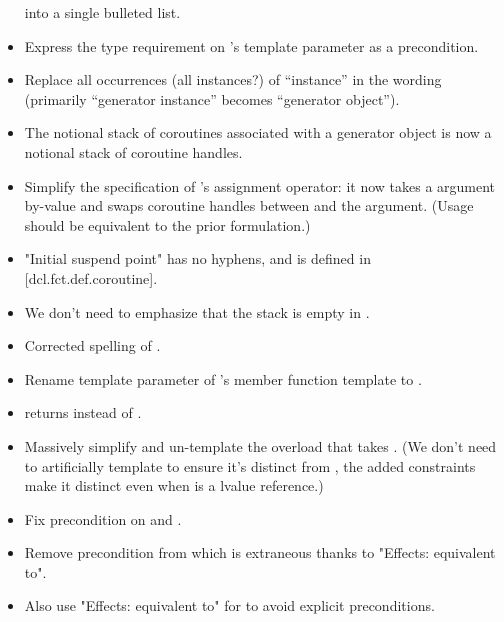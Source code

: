 \documentclass{wg21}
\begin{document}
\begin{itemize}
  into a single bulleted list.
\item Express the type requirement on 's 
  template parameter as a precondition.
\item Replace all occurrences (all instances?) of ``instance'' in the wording
  (primarily ``generator instance'' becomes ``generator object'').
\item The notional stack of coroutines associated with a generator object
  is now a notional stack of coroutine handles.
\item Simplify the specification of 's assignment operator:
  it now takes a  argument by-value and swaps coroutine handles
  between  and the argument. (Usage should be equivalent to the
  prior formulation.)
\item "Initial suspend point" has no hyphens, and
  is defined in [dcl.fct.def.coroutine].
\item We don't need to emphasize that the stack is empty in .
\item Corrected spelling of .
\item Rename template parameter  of 's
   member function template to .
\item {} returns  instead of
  .
\item Massively simplify and un-template the  overload that
  takes . (We don't need to
  artificially template to ensure it's distinct from
  , the added constraints make it distinct
  even when  is a  lvalue reference.)
\item Fix precondition on  and
  .
\item Remove precondition from 
  which is extraneous thanks to "Effects: equivalent to".
\item Also use "Effects: equivalent to" for  to avoid explicit
  preconditions.
\end{itemize}
\end{document}
